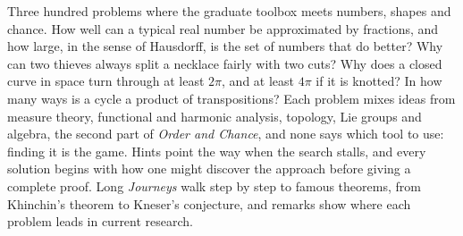 Three hundred problems where the graduate toolbox meets numbers, shapes and chance. How well can a typical real number be
approximated by fractions, and how large, in the sense of Hausdorff, is the set of numbers that do better? Why can two
thieves always split a necklace fairly with two cuts? Why does a closed curve in space turn through at least $2\pi$, and
at least $4\pi$ if it is knotted? In how many ways is a cycle a product of transpositions? Each problem mixes ideas from
measure theory, functional and harmonic analysis, topology, Lie groups and algebra, the second part of \emph{Order and
Chance}, and none says which tool to use: finding it is the game. Hints point the way when the search stalls, and every
solution begins with how one might discover the approach before giving a complete proof. Long \emph{Journeys} walk step by
step to famous theorems, from Khinchin's theorem to Kneser's conjecture, and remarks show where each problem leads in
current research.
